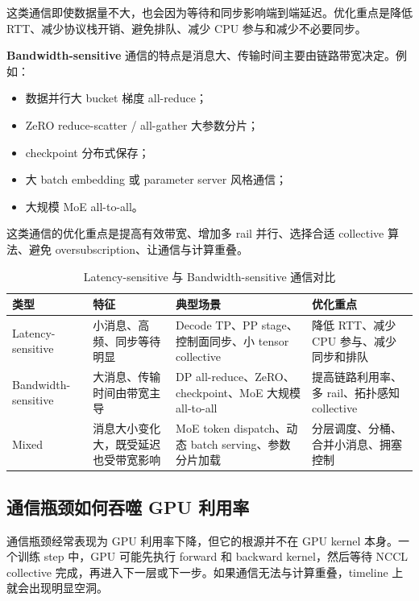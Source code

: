 这类通信即使数据量不大，也会因为等待和同步影响端到端延迟。优化重点是降低 RTT、减少协议栈开销、避免排队、减少 CPU 参与和减少不必要同步。

\textbf{Bandwidth-sensitive} 通信的特点是消息大、传输时间主要由链路带宽决定。例如：

\begin{itemize}
  \item 数据并行大 bucket 梯度 all-reduce；
  \item ZeRO reduce-scatter / all-gather 大参数分片；
  \item checkpoint 分布式保存；
  \item 大 batch embedding 或 parameter server 风格通信；
  \item 大规模 MoE all-to-all。
\end{itemize}

这类通信的优化重点是提高有效带宽、增加多 rail 并行、选择合适 collective 算法、避免 oversubscription、让通信与计算重叠。

\begin{table}[H]
  \centering
  \caption{Latency-sensitive 与 Bandwidth-sensitive 通信对比}
  \label{tab:latency-bandwidth-communication}
  \begin{tabular}{p{3.2cm}p{4.6cm}p{4.6cm}p{3.0cm}}
    \toprule
    类型 & 特征 & 典型场景 & 优化重点 \\
    \midrule
    Latency-sensitive & 小消息、高频、同步等待明显 & Decode TP、PP stage、控制面同步、小 tensor collective & 降低 RTT、减少 CPU 参与、减少同步和排队 \\
    Bandwidth-sensitive & 大消息、传输时间由带宽主导 & DP all-reduce、ZeRO、checkpoint、MoE 大规模 all-to-all & 提高链路利用率、多 rail、拓扑感知 collective \\
    Mixed & 消息大小变化大，既受延迟也受带宽影响 & MoE token dispatch、动态 batch serving、参数分片加载 & 分层调度、分桶、合并小消息、拥塞控制 \\
    \bottomrule
  \end{tabular}
\end{table}

\subsection{通信瓶颈如何吞噬 GPU 利用率}
\label{subsec:communication-bottleneck-gpu-utilization}

通信瓶颈经常表现为 GPU 利用率下降，但它的根源并不在 GPU kernel 本身。一个训练 step 中，GPU 可能先执行 forward 和 backward kernel，然后等待 NCCL collective 完成，再进入下一层或下一步。如果通信无法与计算重叠，timeline 上就会出现明显空洞。

